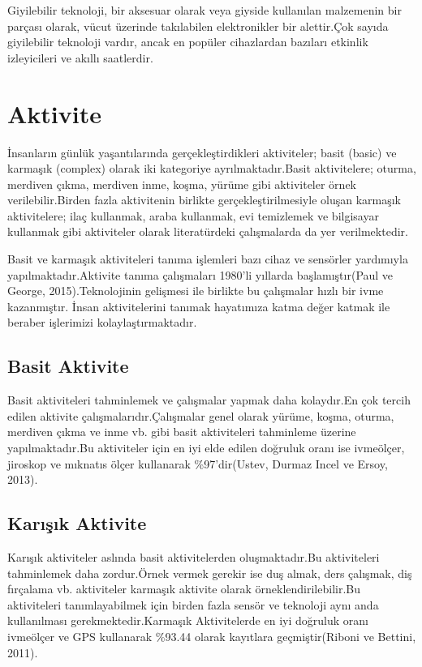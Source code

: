 \documentclass[12pt,twoside]{deuthesis}
\begin{document}
Giyilebilir teknoloji, bir aksesuar olarak veya giyside kullanılan malzemenin bir parçası olarak, vücut üzerinde takılabilen elektronikler bir alettir.Çok sayıda giyilebilir teknoloji vardır, ancak en popüler cihazlardan bazıları etkinlik izleyicileri ve akıllı saatlerdir.

\hypertarget{aktivite}{%
\section{Aktivite}\label{aktivite}}

İnsanların günlük yaşantılarında gerçekleştirdikleri aktiviteler; basit (basic) ve karmaşık (complex) olarak iki kategoriye ayrılmaktadır.Basit aktivitelere; oturma, merdiven çıkma, merdiven inme, koşma, yürüme gibi aktiviteler örnek verilebilir.Birden fazla aktivitenin birlikte gerçekleştirilmesiyle oluşan karmaşık aktivitelere; ilaç kullanmak, araba kullanmak, evi temizlemek ve bilgisayar kullanmak gibi aktiviteler olarak literatürdeki çalışmalarda da yer verilmektedir.

Basit ve karmaşık aktiviteleri tanıma işlemleri bazı cihaz ve sensörler yardımıyla yapılmaktadır.Aktivite tanıma çalışmaları 1980'li yıllarda başlamıştır(Paul ve George, 2015).Teknolojinin gelişmesi ile birlikte bu çalışmalar hızlı bir ivme kazanmıştır. İnsan aktivitelerini tanımak hayatımıza katma değer katmak ile beraber işlerimizi kolaylaştırmaktadır.

\hypertarget{basit-aktivite}{%
\subsection{Basit Aktivite}\label{basit-aktivite}}

Basit aktiviteleri tahminlemek ve çalışmalar yapmak daha kolaydır.En çok tercih edilen aktivite çalışmalarıdır.Çalışmalar genel olarak yürüme, koşma, oturma, merdiven çıkma ve inme vb. gibi basit aktiviteleri tahminleme üzerine yapılmaktadır.Bu aktiviteler için en iyi elde edilen doğruluk oranı ise ivmeölçer, jiroskop ve mıknatıs ölçer kullanarak \%97'dir(Ustev, Durmaz Incel ve Ersoy, 2013).

\hypertarget{karux131ux15fux131k-aktivite}{%
\subsection{Karışık Aktivite}\label{karux131ux15fux131k-aktivite}}

Karışık aktiviteler aslında basit aktivitelerden oluşmaktadır.Bu aktiviteleri tahminlemek daha zordur.Örnek vermek gerekir ise duş almak, ders çalışmak, diş fırçalama vb. aktiviteler karmaşık aktivite olarak örneklendirilebilir.Bu aktiviteleri tanımlayabilmek için birden fazla sensör ve teknoloji aynı anda kullanılması gerekmektedir.Karmaşık Aktivitelerde en iyi doğruluk oranı ivmeölçer ve GPS kullanarak \%93.44 olarak kayıtlara geçmiştir(Riboni ve Bettini, 2011).
\end{document}
